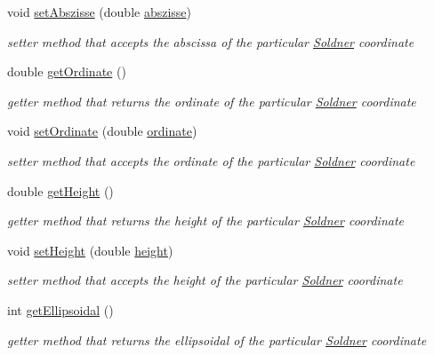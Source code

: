 \begin{DoxyCompactItemize}
void \hyperlink{classcoordinates_1_1_soldner_ab1de539c6b4d0855debaa87339edbedd}{set\+Abszisse} (double \hyperlink{classcoordinates_1_1_soldner_ab1bec5d8a11e84c0cdc3154fd1abf843}{abszisse})
\begin{DoxyCompactList}\small\item\em setter method that accepts the abscissa of the particular \hyperlink{classcoordinates_1_1_soldner}{Soldner} coordinate \end{DoxyCompactList}\item 
double \hyperlink{classcoordinates_1_1_soldner_abb044e1be4724e6cd0ee72083a6245d0}{get\+Ordinate} ()
\begin{DoxyCompactList}\small\item\em getter method that returns the ordinate of the particular \hyperlink{classcoordinates_1_1_soldner}{Soldner} coordinate \end{DoxyCompactList}\item 
void \hyperlink{classcoordinates_1_1_soldner_a991dbfcef201d4740613960da3794bf6}{set\+Ordinate} (double \hyperlink{classcoordinates_1_1_soldner_ab13e1d9275b47a0754ed33c572dba57a}{ordinate})
\begin{DoxyCompactList}\small\item\em setter method that accepts the ordinate of the particular \hyperlink{classcoordinates_1_1_soldner}{Soldner} coordinate \end{DoxyCompactList}\item 
double \hyperlink{classcoordinates_1_1_soldner_a0b9ff78b3e7f94bef19549746c67ea92}{get\+Height} ()
\begin{DoxyCompactList}\small\item\em getter method that returns the height of the particular \hyperlink{classcoordinates_1_1_soldner}{Soldner} coordinate \end{DoxyCompactList}\item 
void \hyperlink{classcoordinates_1_1_soldner_afc305a8276613f55b9aa79638a514789}{set\+Height} (double \hyperlink{classcoordinates_1_1_soldner_a4db9877edcf2391422fe532bd7131856}{height})
\begin{DoxyCompactList}\small\item\em setter method that accepts the height of the particular \hyperlink{classcoordinates_1_1_soldner}{Soldner} coordinate \end{DoxyCompactList}\item 
int \hyperlink{classcoordinates_1_1_soldner_ace54cd7d0157cf876c22e7877fc65c01}{get\+Ellipsoidal} ()
\begin{DoxyCompactList}\small\item\em getter method that returns the ellipsoidal of the particular \hyperlink{classcoordinates_1_1_soldner}{Soldner} coordinate \end{DoxyCompactList}\item 

\end{DoxyCompactItemize}
